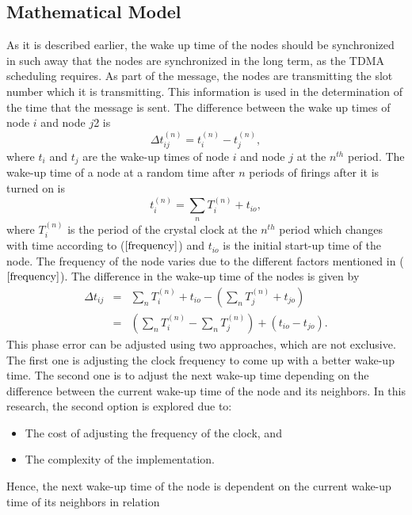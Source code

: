 \documentclass[journal]{IEEEtran}
\begin{document}
\subsection{\textbf{Mathematical Model}}
As it is described earlier, the wake up time of the nodes should be
synchronized in such away that the nodes are synchronized in the
long term, as the TDMA scheduling requires. As part of the message, the nodes are transmitting
the slot number which it is transmitting. This information is used in the determination of the time
that the message is sent.\newline 
The difference between the wake up times of node $i$ and node $j$2 is
\begin{equation}
\Delta t_{ij}^{(n)} = t_i^{(n)} - t_j^{(n)} ,
\end{equation}
where $t_i$ and $t_j$ are the wake-up times of node $i$ and node $j$
at the $n^{th}$ period. The wake-up time of a node at a random time
after $n$ periods of firings after it is turned on is
\begin{equation}
t_i^{(n)} = \sum_{n} T_i^{(n)} + t_{io},
\end{equation}
where  $T_i^{(n)}$ is the period of the crystal clock at the
$n^{th}$ period which changes with time according to
($\ref{frequency}$) and $t_{io}$ is the initial start-up time of the
node. The frequency of the node varies due to the different factors
mentioned in ($\ref{frequency}$). \newline
The difference in the
wake-up time of the nodes is given by
\begin{eqnarray}
\Delta t_{ij} & = & \sum_{n}T_i^{(n)} + t_{io}- (\sum_{n}T_j^{(n)} +
t_{jo}) \\ &=& (\sum_{n}T_i^{(n)} - \sum_{n}T_j^{(n)}) +
(t_{io}-t_{jo}).
\end{eqnarray}
This phase error can be adjusted using two approaches, which are not exclusive. The first
one is adjusting the clock frequency to come up with a better
wake-up time. The second one is to adjust the next wake-up time
depending on the difference between the current wake-up time of the
node and its neighbors. In this research, the second option is
explored due to:
\begin{itemize}
\item The cost of adjusting the frequency of the clock, and 
\item The complexity of the implementation.
\end{itemize}
Hence, the next wake-up time of the node is
dependent on the current wake-up time of its neighbors in relation
\end{document}
